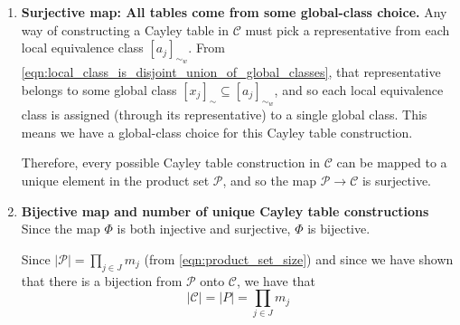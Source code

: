 \begin{proofE}
\begin{enumerate}
    \item \textbf{Surjective map: All tables come from some global-class choice.}
    Any way of constructing a Cayley table in $\mathscr{C}$ must pick a representative from each local equivalence class $[a_{j}]_{\sim_{w}}$.
    From \cref{eqn:local_class_is_disjoint_union_of_global_classes}, that representative belongs to some global class $[x_{j}]_{\sim} \subseteq [a_{j}]_{\sim_{w}}$, and so each local equivalence class is assigned (through its representative) to a single global class.
    This means we have a global-class choice for this Cayley table construction.

    Therefore, every possible Cayley table construction in $\mathscr{C}$ can be mapped to a unique element in the product set $\mathcal{P}$, and so the map $\mathcal{P} \to \mathcal{C}$ is surjective.

    \item \textbf{Bijective map and number of unique Cayley table constructions}
    Since the map $\Phi$ is both injective and surjective, $\Phi$ is bijective.

    Since $|\mathcal{P}| = \prod_{j \in J} m_{j}$ (from \cref{eqn:product_set_size}) and since we have shown that there is a bijection from $\mathcal{P}$ onto $\mathcal{C}$, we have that
    \begin{equation}
        |\mathcal{C}| = |P| = \prod_{j \in J} m_{j}
    \end{equation}
\end{enumerate}
\end{proofE}


